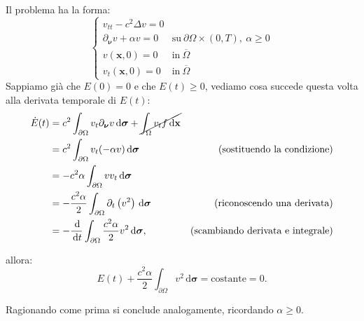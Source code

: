\documentclass[10pt,a4paper,twoside,openright]{book}
\newcommand{\x}{\mathbf{x}}
\newcommand{\sigg}{\bm{\sigma}}
\newcommand{\de}{\,\mathrm d}
\newcommand{\dt}{\de t}
\newcommand{\dxx}{\de \x}
\newcommand{\dsig}{\de \sigg}
\begin{document}
\begin{dimostrazione}
\begin{itemize}
              Il problema ha la forma:
              \begin{equation*}
                  \begin{cases}
                      v_{tt} -c^{2} \Delta v=0           &                                                                \\
                      \partial _{\bm{\nu }} v+\alpha v=0 & \text{su} \ \partial \Omega \times (0,T) ,\ \alpha \geqslant 0 \\
                      v(\x ,0) =0                        & \text{in} \ \overline{\Omega }                                 \\
                      v_{t}(\x ,0) =0                    & \text{in} \ \overline{\Omega }
                  \end{cases}
              \end{equation*}Sappiamo già che $E(0) =0$ e che $E(t) \geqslant 0$, vediamo cosa succede questa volta alla derivata temporale di $E(t)$:
              \begin{align*}
                  \dot{E}(t) & =c^{2}\int _{\partial \Omega } v_{t} \partial _{\bm{\nu }} v\dsig +\cancel{\int _{\Omega } v_{t} f\dxx} &                                          \\
                             & =c^{2}\int _{\partial \Omega } v_{t}(-\alpha v) \dsig                                                   & \text{(sostituendo la condizione)}       \\
                             & =-c^{2} \alpha \int _{\partial \Omega } vv_{t} \dsig                                                    &                                          \\
                             & =-\frac{c^{2} \alpha }{2}\int _{\partial \Omega } \partial _{t}\left(v^{2}\right) \dsig                 & \text{(riconoscendo una derivata)}       \\
                             & =-\frac{\de}{\dt}\int _{\partial \Omega }\frac{c^{2} \alpha }{2} v^{2} \dsig ,                          & \text{(scambiando derivata e integrale)}
              \end{align*}

              allora:
              \begin{equation*}
                  E(t) +\frac{c^{2} \alpha }{2}\int _{\partial \Omega } v^{2} \dsig =\text{costante} =0.
              \end{equation*}

              Ragionando come prima si conclude analogamente, ricordando $\alpha \geqslant 0$.
    \end{itemize}
\end{dimostrazione}
\end{document}
